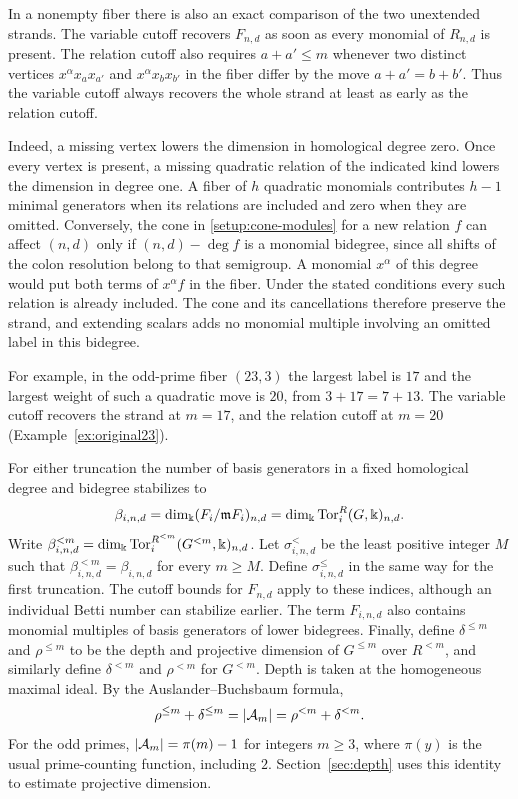 In a nonempty fiber there is also an exact comparison of the two
unextended strands. The variable cutoff recovers $F_{n,d}$ as soon
as every monomial of $R_{n,d}$ is present. The relation cutoff
also requires $a+a'\le m$ whenever two distinct vertices
$x^\alpha x_ax_{a'}$ and $x^\alpha x_bx_{b'}$ in the fiber differ by the move
$a+a'=b+b'$.
Thus the variable cutoff always recovers the whole strand at least
as early as the relation cutoff.

Indeed, a missing vertex lowers the dimension in homological degree
zero. Once every vertex is present, a missing quadratic relation of
the indicated kind lowers the dimension in degree one. A fiber
of $h$ quadratic monomials contributes $h-1$ minimal
generators when its relations are included and zero when they are
omitted. Conversely, the cone in \eqref{setup:cone-modules} for a
new relation $f$ can affect $(n,d)$ only if $(n,d)-\deg f$ is a
monomial bidegree, since all shifts of the colon resolution belong
to that semigroup. A monomial $x^\alpha$ of this degree would put both
terms of $x^\alpha f$ in the fiber. Under the stated conditions every such
relation is already included. The cone and its cancellations
therefore preserve the strand, and extending scalars adds no
monomial multiple involving an omitted label in this bidegree.

For example, in the odd-prime fiber $(23,3)$ the largest label is
$17$ and the largest weight of such a quadratic move is $20$, from
$3+17=7+13$. The variable cutoff recovers the strand at $m=17$,
and the relation cutoff at $m=20$ (Example~\ref{ex:original23}).

For either truncation the number of basis generators in a fixed
homological degree and bidegree stabilizes to
\[
 \beta_{i,n,d}=\dim_\Bbbk(F_i/\mathfrak m F_i)_{n,d}
              =\dim_\Bbbk\operatorname{Tor}_i^R(G,\Bbbk)_{n,d}.
\]
Write $\beta^{<m}_{i,n,d}=\dim_\Bbbk\operatorname{Tor}_i^{R^{<m}}(G^{<m},\Bbbk)_{n,d}$.
Let $\sigma^{<}_{i,n,d}$ be the least positive integer $M$ such that
$\beta^{<m}_{i,n,d}=\beta_{i,n,d}$ for every $m\ge M$.
Define $\sigma^{\le}_{i,n,d}$ in the same way for the first truncation.
The cutoff bounds for $F_{n,d}$ apply to these indices, although an
individual Betti number can stabilize earlier.
The term $F_{i,n,d}$ also contains monomial multiples of basis
generators of lower bidegrees. Finally, define $\delta^{\le m}$ and
$\rho^{\le m}$ to be the depth and projective dimension of $G^{\le m}$
over $R^{<m}$, and similarly define $\delta^{<m}$ and $\rho^{<m}$ for
$G^{<m}$. Depth is taken at the homogeneous maximal ideal. By the
Auslander--Buchsbaum formula,
\begin{equation}\label{setup:AB-cutoffs}
 \rho^{\le m}+\delta^{\le m}=|\mathcal A_m|
                       =\rho^{<m}+\delta^{<m}.
\end{equation}
For the odd primes, $|\mathcal A_m|=\pi(m)-1$ for integers $m\ge3$,
where $\pi(y)$ is the usual prime-counting function, including $2$.
Section~\ref{sec:depth} uses this identity to estimate projective
dimension.

